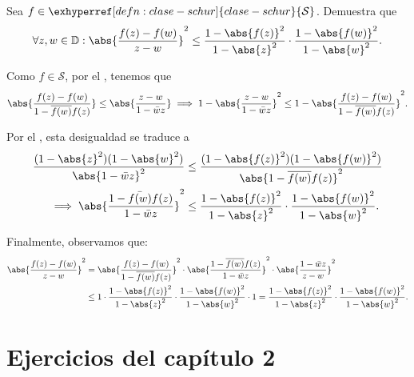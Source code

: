 \begin{ejer}\label{ejer:desigualdad-schwarz-pick}
    Sea $f \in \exhyperref[defn:clase-schur]{clase-schur}{\mathcal{S}}$. Demuestra que
    \[
    \forall z, w \in \mathbb{D} : \abs{\frac{f(z) - f(w)}{z-w}}^2 \leq \frac{1 - \abs{f(z)}^2}{1 - \abs{z}^2} \cdot \frac{1 - \abs{f(w)}^2}{1 - \abs{w}^2}.
    \]
\end{ejer}
\begin{sol}
    Como $f \in \mathcal{S}$, por el , tenemos que
    \[
    \abs{\frac{f(z) - f(w)}{1 - \overline{f(w)} f(z)}} \leq \abs{\frac{z - w}{1 - \bar{w} z}} \implies 1 - \abs{\frac{z - w}{1 - \bar{w} z}}^2 \leq 1 - \abs{\frac{f(z) - f(w)}{1 - \overline{f(w)} f(z)}}^2. 
    \]

    Por el , esta desigualdad se traduce a
    \[
    \begin{aligned}
        \frac{(1 - \abs{z}^2)(1 - \abs{w}^2)}{\abs{1 - \bar{w} z}^2} &\leq \frac{(1 - \abs{f(z)}^2)(1 - \abs{f(w)}^2)}{\abs{1 - \overline{f(w)} f(z)}^2} \\
        \implies \abs{\frac{1 - \bar{f(w)} f(z)}{1 - \bar{w} z}}^2 &\leq \frac{1 - \abs{f(z)}^2}{1 - \abs{z}^2} \cdot \frac{1 - \abs{f(w)}^2}{1 - \abs{w}^2}.
    \end{aligned}
    \]

    Finalmente, observamos que:
    \[
    \begin{aligned}
        \abs{\frac{f(z) - f(w)}{z - w}}^2 &= \abs{\frac{f(z) - f(w)}{1 - \overline{f(w)} f(z)}}^2 \cdot \abs{\frac{1 - \overline{f(w)} f(z)}{1 - \bar{w} z}}^2 \cdot \abs{\frac{1 - \bar{w} z}{z - w}}^2 \\
        &\leq 1 \cdot \frac{1 - \abs{f(z)}^2}{1 - \abs{z}^2} \cdot \frac{1 - \abs{f(w)}^2}{1 - \abs{w}^2} \cdot 1 = \frac{1 - \abs{f(z)}^2}{1 - \abs{z}^2} \cdot \frac{1 - \abs{f(w)}^2}{1 - \abs{w}^2}.
    \end{aligned}
    \]

    \vspace{-\baselineskip}
    \vspace{-\belowdisplayskip}
    \hfill \qedsymbol
\end{sol}

\section{Ejercicios del capítulo 2}

